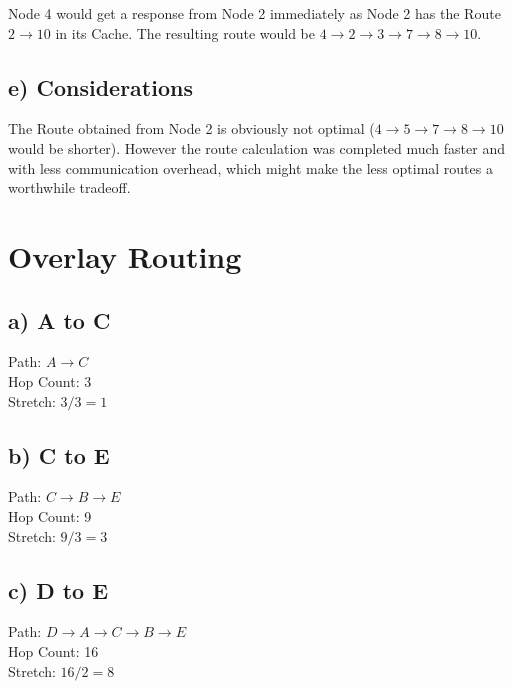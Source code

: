 \documentclass[a4paper, 11 pt, article, accentcolor=tud7b]{tudreport}
\begin{document}
	Node 4 would get a response from Node 2 immediately as Node 2 has the Route $2 \rightarrow 10$ in its Cache. The resulting route would be $4 \rightarrow 2 \rightarrow 3 \rightarrow 7 \rightarrow 8 \rightarrow 10$.
	
	\subsection*{e) Considerations}
	
	The Route obtained from Node 2 is obviously not optimal ($4 \rightarrow 5 \rightarrow 7 \rightarrow 8 \rightarrow 10$ would be shorter). However the route calculation was completed much faster and with less communication overhead, which might make the less optimal routes a worthwhile tradeoff.
	
	\section{Overlay Routing}
	
	\subsection*{a) A to C}
	Path: $A \rightarrow C$ \\
	Hop Count: 3 \\
	Stretch: $3 / 3 = 1$
	
	\subsection*{b) C to E}
	Path: $C \rightarrow B \rightarrow E$ \\
	Hop Count: 9 \\
	Stretch: $9 / 3 = 3$
	
	\subsection*{c) D to E}
	Path: $D \rightarrow A \rightarrow C \rightarrow B \rightarrow E$ \\
	Hop Count: 16 \\
	Stretch: $16 / 2 = 8$
	
\end{document}
